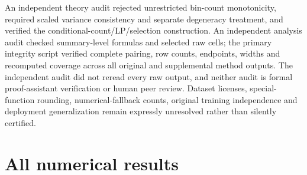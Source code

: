 \documentclass{article}
\begin{document}
An independent theory audit rejected unrestricted bin-count monotonicity, required scaled variance consistency and separate degeneracy treatment, and verified the conditional-count/LP/selection construction. An independent analysis audit checked summary-level formulas and selected raw cells; the primary integrity script verified complete pairing, row counts, endpoints, widths and recomputed coverage across all original and supplemental method outputs. The independent audit did not reread every raw output, and neither audit is formal proof-assistant verification or human peer review. Dataset licenses, special-function rounding, numerical-fallback counts, original training independence and deployment generalization remain expressly unresolved rather than silently certified.

\clearpage
\section{All numerical results}\label{app:allresults}


\clearpage

\end{document}
